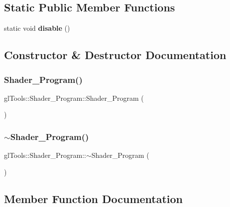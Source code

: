 \subsection*{Static Public Member Functions}
\begin{DoxyCompactItemize}
\item 
static void \textbf{ disable} ()
\end{DoxyCompactItemize}


\subsection{Constructor \& Destructor Documentation}
\mbox{\label{classgl_tools_1_1_shader___program_a6c4657a63fa2ad719e01158d6982af01}} 
\subsubsection{Shader\_Program()}
{\footnotesize\ttfamily gl\+Tools\+::\+Shader\+\_\+\+Program\+::\+Shader\+\_\+\+Program (\begin{DoxyParamCaption}{ }\end{DoxyParamCaption})\hspace{0.3cm}{\ttfamily [inline]}}

\mbox{\label{classgl_tools_1_1_shader___program_ab8b92b3ed0107b8e5058c59836f40f5e}} 
\subsubsection{$\sim$Shader\_Program()}
{\footnotesize\ttfamily gl\+Tools\+::\+Shader\+\_\+\+Program\+::$\sim$\+Shader\+\_\+\+Program (\begin{DoxyParamCaption}{ }\end{DoxyParamCaption})\hspace{0.3cm}{\ttfamily [inline]}}



\subsection{Member Function Documentation}
\mbox{\label{classgl_tools_1_1_shader___program_aa30fbd811a11a8b0f90046c549501260}} 
